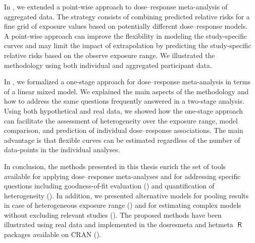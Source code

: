 \documentclass[11pt,a4paper,twoside,openany]{book}\usepackage{knitr}
\makeatletter
\def\cleardoublepage{\clearpage\if@twoside
\ifodd\c@page
\else\hbox{}\thispagestyle{empty}\newpage
\if@twocolumn\hbox{}\newpage\fi\fi\fi}
\newcommand{\pkg}[1]{{\fontseries{b}\selectfont #1}}
\DeclareMathOperator{\R}{\textsf{R}}
\makeatother
\begin{document}
{In , we extended a point-wise approach to dose--response meta-analysis of aggregated data. The strategy consists of combining predicted relative risks for a fine grid of exposure values based on potentially different dose--response models. A point-wise approach can improve the flexibility in modeling the study-specific curves and may limit the impact of extrapolation by predicting the study-specific relative risks based on the observe exposure range. We illustrated the methodology using both individual and aggregated participant data.

In , we formalized a one-stage approach for dose--response meta-analysis in terms of a linear mixed model. We explained the main aspects of the methodology and how to address the same questions frequently answered in a two-stage analysis. Using both hypothetical and real data, we showed how the one-stage approach can facilitate the assessment of heterogeneity over the exposure range, model comparison, and prediction of individual dose--response associations. The main advantage is that flexible curves can be estimated regardless of the number of data-points in the individual analyses.

In conclusion, the methods presented in this thesis enrich the set of tools available for applying dose--response meta-analyses and for addressing specific questions including goodness-of-fit evaluation () and quantification of heterogeneity (). In addition, we presented alternative models for pooling results in case of heterogeneous exposure range () and for estimating complex models without excluding relevant studies (). The proposed methods have been illustrated using real data and implemented in the \pkg{dosresmeta} and \pkg{hetmeta} $\R$ packages available on CRAN ().


\normalsize
\cleardoublepage

%


}
\end{document}
